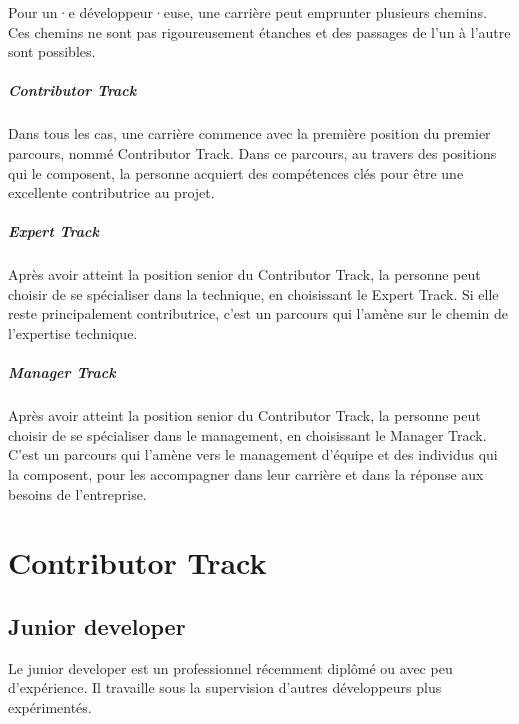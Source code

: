 \documentclass[a4paper, french, openany, 12pt]{book}
\newcommand\dev{développeur·euse}
\begin{document}
\begin{multicols}{2}
  Pour un·e \dev, une carrière peut emprunter plusieurs chemins.
  Ces chemins ne sont pas rigoureusement étanches et des passages de l'un à l'autre sont possibles.

  \subsubsection*{Contributor Track}

  Dans tous les cas, une carrière commence avec la première position du premier parcours, nommé Contributor Track.
  Dans ce parcours, au travers des positions qui le composent, la personne acquiert des compétences clés pour être une
  excellente contributrice au projet.

  \subsubsection*{Expert Track}

  Après avoir atteint la position senior du Contributor Track, la personne peut choisir de se spécialiser
  dans la technique, en choisissant le Expert Track.
  Si elle reste principalement contributrice, c'est un parcours qui l'amène sur le chemin de l'expertise technique.

  \subsubsection*{Manager Track}

  Après avoir atteint la position senior du Contributor Track, la personne peut choisir de se spécialiser
  dans le management, en choisissant le Manager Track.
  C'est un parcours qui l'amène vers le management d'équipe et des individus qui la composent, pour les
  accompagner dans leur carrière et dans la réponse aux besoins de l'entreprise.

\end{multicols}

\part{Contributor Track}

\chapter{Junior developer}

Le junior developer est un professionnel récemment diplômé ou avec peu d’expérience.
Il travaille sous la supervision d'autres développeurs plus expérimentés.
\end{document}
